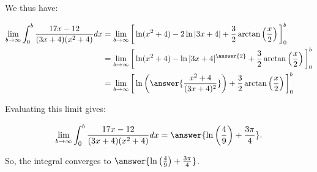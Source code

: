 \documentclass{ximera}
\begin{document}
\begin{exercise}
\begin{exercise}
\begin{exercise}
\begin{exercise}
We thus have:

\begin{align*}
\lim_{b\rightarrow \infty} \int_{0}^{b} \frac{17x-12}{(3x+4)(x^2+4)} dx &= \lim_{b\rightarrow \infty} \bigg[\ln(x^2+4)-2 \ln|3x+4|+\frac{3}{2} \arctan\left(\frac{x}{2}\right)\bigg]_0^b  \\
&= \lim_{b\rightarrow \infty} \bigg[\ln(x^2+4)- \ln|3x+4|^{\answer{2}}+\frac{3}{2} \arctan\left(\frac{x}{2}\right)\bigg]_0^b \\
&= \lim_{b\rightarrow \infty} \bigg[\ln\left(\answer{\frac{x^2+4}{(3x+4)^2}}\right)+\frac{3}{2} \arctan\left(\frac{x}{2}\right)\bigg]_0^b
\end{align*}

Evaluating this limit gives:

\[ \lim_{b\rightarrow \infty} \int_{0}^{b} \frac{17x-12}{(3x+4)(x^2+4)} dx  = \answer{\ln\left(\frac{4}{9}\right) + \frac{3 \pi}{4}  }.
\]

So, the integral converges to $\answer{\ln\left(\frac{4}{9}\right) + \frac{3 \pi}{4}  }$.
\end{exercise}
\end{exercise}
\end{exercise}









\end{exercise}
\end{document}
